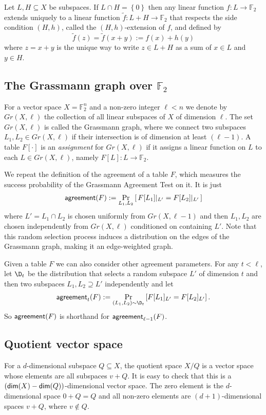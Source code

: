 \documentclass{toc}
\newcommand\set[1]{{\left\{ #1 \right\}}}
\newcommand\Prob[2]{{\Pr_{#1}\left[ {#2} \right]}}
\newcommand*\dimm{{\sf dim}}
\renewcommand\subset{\subseteq}
\renewcommand\supset{\supseteq}
\def\F{\mathbb{F}}
\def\agr{{\sf agreement}}
\begin{document}
\begin{definition}\label{def:extension}
Let $L,H\subset X$ be subspaces. If $L\cap H=\set 0$ then any linear function $f:L\to\F_2$ extends uniquely to a linear function $\tilde f:L+H\to\F_2$ that respects the side condition $(H,h)$, called the $(H,h)$-extension of $f$, and defined by
\[ \tilde f(z) = \tilde f (x + y) := f(x) + h(y)
\] where $z=x+y$ is the unique way to write $z\in L+H$ as a sum of $x\in L$ and $y\in H$.
\end{definition}

\subsection{The Grassmann graph over \texorpdfstring{$\F_2$}{F\_2}}

For a vector space $X=\F_2^n$ and a non-zero integer $\ell<n$ we
denote by $Gr(X,\ell)$ the collection of all linear subspaces of $X$
of dimension $\ell$. The set  $Gr(X,\ell)$ is called the Grassmann graph, where we
connect two subspaces $L_1,L_2\in Gr(X,\ell)$ if their intersection is
of dimension at least $(\ell-1)$.
%
A table $F[\cdot]$ is an {\em assignment} for $Gr(X,\ell)$ if it
assigns a linear function on $L$  to each $L\in Gr(X,\ell)$, namely $F[L]:L\to \F_2$.

We repeat the definition of the agreement of a table $F$, which
measures the success probability of the Grassmann Agreement Test on it. It is just
\[ \agr(F) := \Prob{L_1,L_2}{\, F[L_1]|_{L'} = F[L_2]|_{L'}\, }
\]
where $L' = L_1\cap L_2$ is chosen uniformly from $Gr(X,\ell-1)$ and
then $L_1,L_2$ are chosen independently from $Gr(X,\ell)$ conditioned
on containing $L'$. Note that this random selection process induces a
distribution on the edges of the Grassmann graph, making it an
edge-weighted graph.

Given a table $F$ we can also consider other agreement parameters. For any $t < \ell$, let $\D_{t}$ be the distribution that selects a random subspace $L'$ of dimension $t$ and then two subspaces $L_1,L_2\supset L'$ independently and let
\begin{equation}\label{eq:agrt} \agr_{t}(F) := \Prob{(L_1,L_2)\sim \D_{t}}{F[L_1]_{L'} = F[L_2]_{L'}} \,.
\end{equation}
So $\agr(F)$ is shorthand for $\agr_{\ell-1}(F)$.

\subsection{Quotient vector space}
For a $d$-dimensional subspace $Q\subset X$, the quotient space $X/Q$ is a vector space whose elements are all subspaces $v + Q$. It is easy to check that this is a $(\dimm(X)-\dimm(Q))$-dimensional vector space. The zero element is the $d$-dimensional space $0+Q=Q$ and all non-zero elements are
$(d+1)$-dimensional
%
spaces $v+Q$, where $v\not\in Q$.
\end{document}
